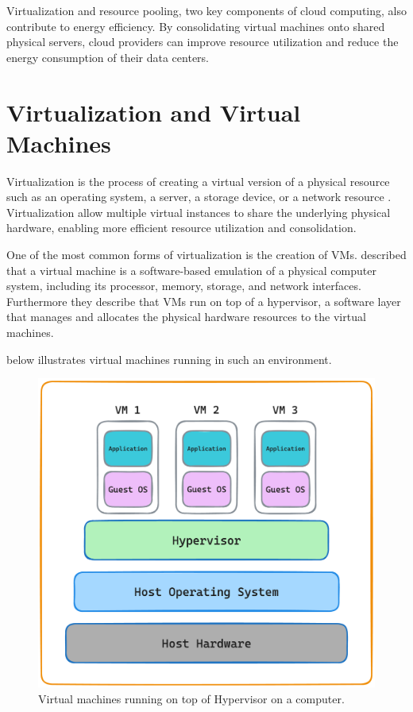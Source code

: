 \documentclass[
  table]{report}
\begin{document}
Virtualization and resource pooling, two key components of cloud
computing, also contribute to energy efficiency. By consolidating
virtual machines onto shared physical servers, cloud providers can
improve resource utilization and reduce the energy consumption of their
data centers. \citep{beloglazovEnergyawareResourceAllocation2012}

\section{Virtualization and Virtual Machines}
\label{sect:virtual}

Virtualization is the process of creating a virtual version of a
physical resource such as an operating system, a server, a storage
device, or a network resource
\citep{chiuehSurveyVirtualizationTechnologies2005}. Virtualization allow
multiple virtual instances to share the underlying physical hardware,
enabling more efficient resource utilization and consolidation.

One of the most common forms of virtualization is the creation of
\ac{VMs}. \citet{barhamXenArtVirtualization2003} described that a
virtual machine is a software-based emulation of a physical computer
system, including its processor, memory, storage, and network
interfaces. Furthermore they describe that \ac{VMs} run on top of a
hypervisor, a software layer that manages and allocates the physical
hardware resources to the virtual machines.

 below illustrates virtual machines running in such an
environment.

\begin{figure}[H]
\centering
  \includegraphics[width=0.7\columnwidth]{assets/3.2-vm-figure.png}
  \caption{Virtual machines running on top of Hypervisor on a computer.}
  \label{vm-figure}
\end{figure}
\end{document}

